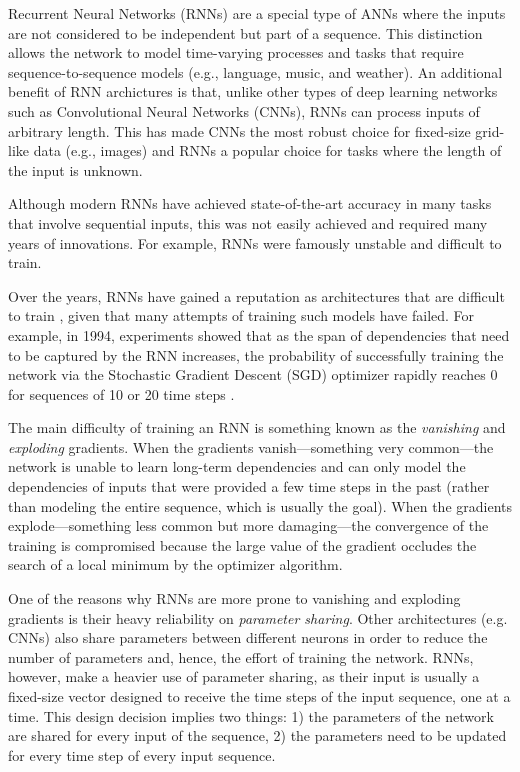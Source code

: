 

Recurrent Neural Networks (RNNs) are a special type of ANNs
where the inputs are not considered to be independent but
part of a sequence. This distinction allows the network to
model time-varying processes and tasks that require
sequence-to-sequence models (e.g., language, music, and
weather). An additional benefit of RNN archictures is that,
unlike other types of deep learning networks such as
Convolutional Neural Networks (CNNs), RNNs can process
inputs of arbitrary length. This has made CNNs the most
robust choice for fixed-size grid-like data (e.g., images)
and RNNs a popular choice for tasks where the length of the
input is unknown.

Although modern RNNs have achieved state-of-the-art accuracy
in many tasks that involve sequential inputs, this was not
easily achieved and required many years of innovations. For
example, RNNs were famously unstable and difficult to train.


Over the years, RNNs have gained a reputation as
architectures that are difficult to train
\parencite{pascanu2013difficulty}, given that many attempts
of training such models have failed. For example, in 1994,
experiments showed that as the span of dependencies that
need to be captured by the RNN increases, the probability of
successfully training the network via the Stochastic
Gradient Descent (SGD) optimizer rapidly reaches 0 for
sequences of 10 or 20 time steps
\parencite{bengio1994learning}.

The main difficulty of training an RNN is something known as
the \emph{vanishing} and \emph{exploding} gradients. When
the gradients vanish---something very common---the network
is unable to learn long-term dependencies and can only model
the dependencies of inputs that were provided a few time
steps in the past (rather than modeling the entire
sequence, which is usually the goal). When the gradients
explode---something less common but more damaging---the
convergence of the training is compromised because the large
value of the gradient occludes the search of a local minimum
by the optimizer algorithm.

One of the reasons why RNNs are more prone to vanishing and
exploding gradients is their heavy reliability on
\emph{parameter sharing}. Other architectures (e.g. CNNs)
also share parameters between different neurons in order to
reduce the number of parameters and, hence, the effort of
training the network. RNNs, however, make a heavier use of
parameter sharing, as their input is usually a fixed-size
vector designed to receive the time steps of the input
sequence, one at a time. This design decision implies two
things: 1) the parameters of the network are shared for
every input of the sequence, 2) the parameters need to be
updated for every time step of every input sequence.

